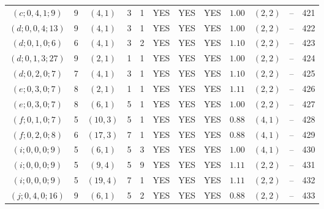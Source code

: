 \begin{longtable}{|c|c|c|c|c|c|c|c|c|c|c|c|}
$(c;0,4,1;9)$ & 9 & $(4,1)$ & 3 & 1 & YES & YES & YES & $1.00$ & $(2,2)$ & -- & 421\\
$(d;0,0,4;13)$ & 9 & $(4,1)$ & 3 & 1 & YES & YES & YES & $1.00$ & $(2,2)$ & -- & 422\\
$(d;0,1,0;6)$ & 6 & $(4,1)$ & 3 & 2 & YES & YES & YES & $1.10$ & $(2,2)$ & -- & 423\\
$(d;0,1,3;27)$ & 9 & $(2,1)$ & 1 & 1 & YES & YES & YES & $1.00$ & $(2,2)$ & -- & 424\\
$(d;0,2,0;7)$ & 7 & $(4,1)$ & 3 & 1 & YES & YES & YES & $1.10$ & $(2,2)$ & -- & 425\\
$(e;0,3,0;7)$ & 8 & $(2,1)$ & 1 & 1 & YES & YES & YES & $1.11$ & $(2,2)$ & -- & 426\\
$(e;0,3,0;7)$ & 8 & $(6,1)$ & 5 & 1 & YES & YES & YES & $1.00$ & $(2,2)$ & -- & 427\\
$(f;0,1,0;7)$ & 5 & $(10,3)$ & 5 & 1 & YES & YES & YES & $0.88$ & $(4,1)$ & -- & 428\\
$(f;0,2,0;8)$ & 6 & $(17,3)$ & 7 & 1 & YES & YES & YES & $0.88$ & $(4,1)$ & -- & 429\\
$(i;0,0,0;9)$ & 5 & $(6,1)$ & 5 & 3 & YES & YES & YES & $1.00$ & $(4,1)$ & -- & 430\\
$(i;0,0,0;9)$ & 5 & $(9,4)$ & 5 & 9 & YES & YES & YES & $1.11$ & $(2,2)$ & -- & 431\\
$(i;0,0,0;9)$ & 5 & $(19,4)$ & 7 & 1 & YES & YES & YES & $1.11$ & $(2,2)$ & -- & 432\\
$(j;0,4,0;16)$ & 9 & $(6,1)$ & 5 & 2 & YES & YES & YES & $0.88$ & $(2,2)$ & -- & 433
\end{longtable}
